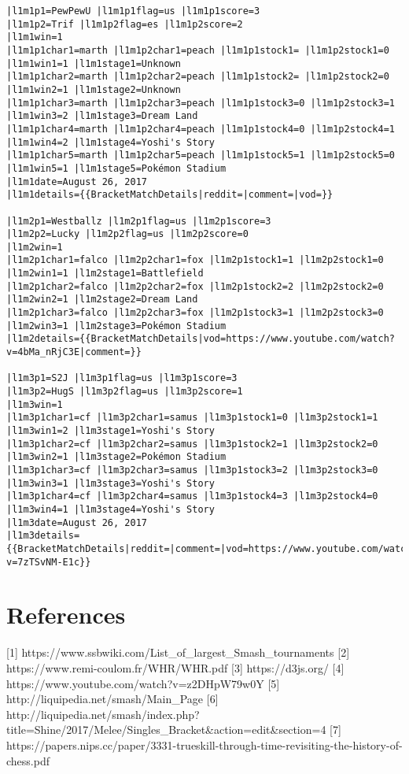 \begin{verbatim}
|l1m1p1=PewPewU |l1m1p1flag=us |l1m1p1score=3
|l1m1p2=Trif |l1m1p2flag=es |l1m1p2score=2
|l1m1win=1
|l1m1p1char1=marth |l1m1p2char1=peach |l1m1p1stock1= |l1m1p2stock1=0 |l1m1win1=1 |l1m1stage1=Unknown
|l1m1p1char2=marth |l1m1p2char2=peach |l1m1p1stock2= |l1m1p2stock2=0 |l1m1win2=1 |l1m1stage2=Unknown
|l1m1p1char3=marth |l1m1p2char3=peach |l1m1p1stock3=0 |l1m1p2stock3=1 |l1m1win3=2 |l1m1stage3=Dream Land
|l1m1p1char4=marth |l1m1p2char4=peach |l1m1p1stock4=0 |l1m1p2stock4=1 |l1m1win4=2 |l1m1stage4=Yoshi's Story
|l1m1p1char5=marth |l1m1p2char5=peach |l1m1p1stock5=1 |l1m1p2stock5=0 |l1m1win5=1 |l1m1stage5=Pokémon Stadium
|l1m1date=August 26, 2017
|l1m1details={{BracketMatchDetails|reddit=|comment=|vod=}}

|l1m2p1=Westballz |l1m2p1flag=us |l1m2p1score=3
|l1m2p2=Lucky |l1m2p2flag=us |l1m2p2score=0
|l1m2win=1
|l1m2p1char1=falco |l1m2p2char1=fox |l1m2p1stock1=1 |l1m2p2stock1=0 |l1m2win1=1 |l1m2stage1=Battlefield
|l1m2p1char2=falco |l1m2p2char2=fox |l1m2p1stock2=2 |l1m2p2stock2=0 |l1m2win2=1 |l1m2stage2=Dream Land
|l1m2p1char3=falco |l1m2p2char3=fox |l1m2p1stock3=1 |l1m2p2stock3=0 |l1m2win3=1 |l1m2stage3=Pokémon Stadium
|l1m2details={{BracketMatchDetails|vod=https://www.youtube.com/watch?v=4bMa_nRjC3E|comment=}}

|l1m3p1=S2J |l1m3p1flag=us |l1m3p1score=3
|l1m3p2=HugS |l1m3p2flag=us |l1m3p2score=1
|l1m3win=1
|l1m3p1char1=cf |l1m3p2char1=samus |l1m3p1stock1=0 |l1m3p2stock1=1 |l1m3win1=2 |l1m3stage1=Yoshi's Story
|l1m3p1char2=cf |l1m3p2char2=samus |l1m3p1stock2=1 |l1m3p2stock2=0 |l1m3win2=1 |l1m3stage2=Pokémon Stadium
|l1m3p1char3=cf |l1m3p2char3=samus |l1m3p1stock3=2 |l1m3p2stock3=0 |l1m3win3=1 |l1m3stage3=Yoshi's Story
|l1m3p1char4=cf |l1m3p2char4=samus |l1m3p1stock4=3 |l1m3p2stock4=0 |l1m3win4=1 |l1m3stage4=Yoshi's Story
|l1m3date=August 26, 2017
|l1m3details={{BracketMatchDetails|reddit=|comment=|vod=https://www.youtube.com/watch?v=7zTSvNM-E1c}}
\end{verbatim}

\hypertarget{references}{%
\section{References}\label{references}}

{[}1{]} https://www.ssbwiki.com/List\_of\_largest\_Smash\_tournaments
{[}2{]} https://www.remi-coulom.fr/WHR/WHR.pdf {[}3{]} https://d3js.org/
{[}4{]} https://www.youtube.com/watch?v=z2DHpW79w0Y {[}5{]}
http://liquipedia.net/smash/Main\_Page {[}6{]}
http://liquipedia.net/smash/index.php?title=Shine/2017/Melee/Singles\_Bracket\&action=edit\&section=4
{[}7{]}
https://papers.nips.cc/paper/3331-trueskill-through-time-revisiting-the-history-of-chess.pdf
